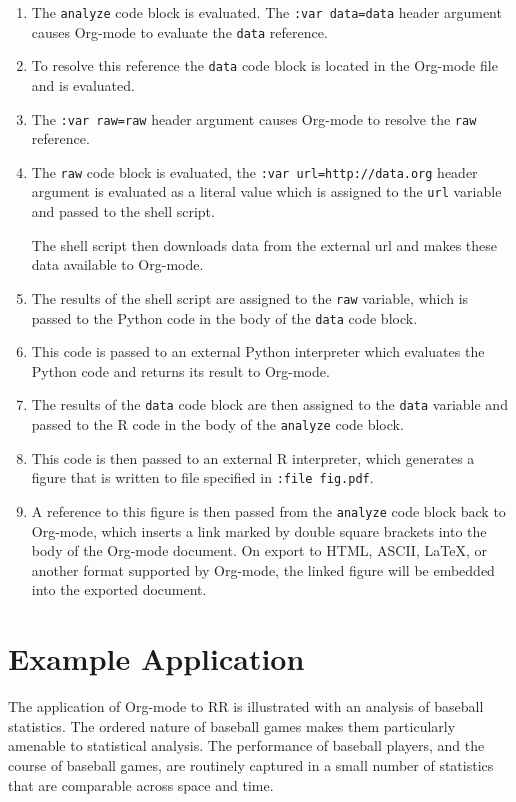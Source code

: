 \documentclass[11pt]{article}
\begin{document}
\begin{enumerate}
\item The \texttt{analyze} code block is evaluated.  The \texttt{:var data=data} header
   argument causes Org-mode to evaluate the \texttt{data} reference.
\item To resolve this reference the \texttt{data} code block is located in the
   Org-mode file and is evaluated.
\item The \texttt{:var raw=raw} header argument causes Org-mode to resolve the
   \texttt{raw} reference.
\item The \texttt{raw} code block is evaluated, the \texttt{:var url=http://data.org}
   header argument is evaluated as a literal value which is assigned
   to the \texttt{url} variable and passed to the shell script.

   The shell script then downloads data from the external url and
   makes these data available to Org-mode.
\item The results of the shell script are assigned to the \texttt{raw} variable,
   which is passed to the Python code in the body of the \texttt{data} code
   block.
\item This code is passed to an external Python interpreter which
   evaluates the Python code and returns its result to Org-mode.
\item The results of the \texttt{data} code block are then assigned to the
   \texttt{data} variable and passed to the R code in the body of the
   \texttt{analyze} code block.
\item This code is then passed to an external R interpreter, which
   generates a figure that is written to file specified in \texttt{:file fig.pdf}.
\item A reference to this figure is then passed from the \texttt{analyze} code
   block back to Org-mode, which inserts a link marked by double
   square brackets into the body of the Org-mode document.  On export
   to HTML, ASCII, \LaTeX{}, or another format supported by Org-mode,
   the linked figure will be embedded into the exported document.
\end{enumerate}
\section{Example Application}
\label{sec-4}

The application of Org-mode to RR is illustrated with an
analysis of baseball statistics.  The ordered nature of
baseball games makes them particularly amenable to statistical
analysis.  The performance of baseball players, and the course of
baseball games, are routinely captured in a small number of statistics
that are comparable across space and time.
\end{document}
